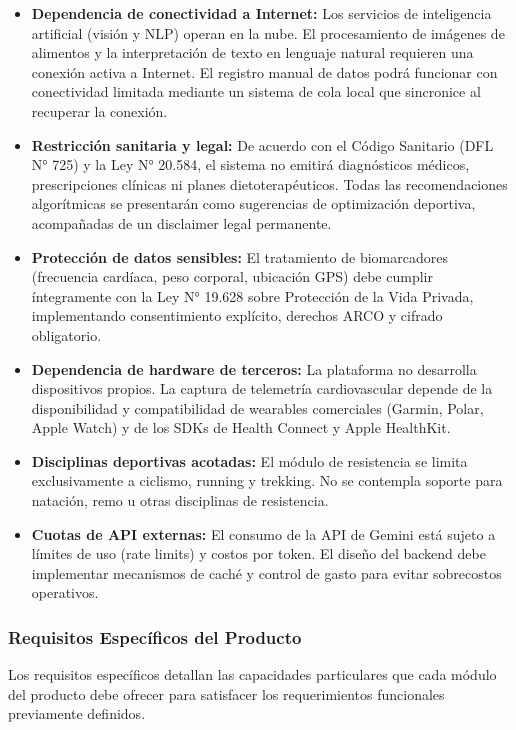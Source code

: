 \begin{itemize}
    \item \textbf{Dependencia de conectividad a Internet:} Los servicios de inteligencia artificial (visión y NLP) operan en la nube. El procesamiento de imágenes de alimentos y la interpretación de texto en lenguaje natural requieren una conexión activa a Internet. El registro manual de datos podrá funcionar con conectividad limitada mediante un sistema de cola local que sincronice al recuperar la conexión.
    \item \textbf{Restricción sanitaria y legal:} De acuerdo con el Código Sanitario (DFL N° 725) y la Ley N° 20.584, el sistema no emitirá diagnósticos médicos, prescripciones clínicas ni planes dietoterapéuticos. Todas las recomendaciones algorítmicas se presentarán como sugerencias de optimización deportiva, acompañadas de un disclaimer legal permanente.
    \item \textbf{Protección de datos sensibles:} El tratamiento de biomarcadores (frecuencia cardíaca, peso corporal, ubicación GPS) debe cumplir íntegramente con la Ley N° 19.628 sobre Protección de la Vida Privada, implementando consentimiento explícito, derechos ARCO y cifrado obligatorio.
    \item \textbf{Dependencia de hardware de terceros:} La plataforma no desarrolla dispositivos propios. La captura de telemetría cardiovascular depende de la disponibilidad y compatibilidad de wearables comerciales (Garmin, Polar, Apple Watch) y de los SDKs de Health Connect y Apple HealthKit.
    \item \textbf{Disciplinas deportivas acotadas:} El módulo de resistencia se limita exclusivamente a ciclismo, running y trekking. No se contempla soporte para natación, remo u otras disciplinas de resistencia.
    \item \textbf{Cuotas de API externas:} El consumo de la API de Gemini está sujeto a límites de uso (rate limits) y costos por token. El diseño del backend debe implementar mecanismos de caché y control de gasto para evitar sobrecostos operativos.
\end{itemize}
\subsubsection{Requisitos Específicos del Producto}
Los requisitos específicos detallan las capacidades particulares que cada módulo del producto debe ofrecer para satisfacer los requerimientos funcionales previamente definidos.


